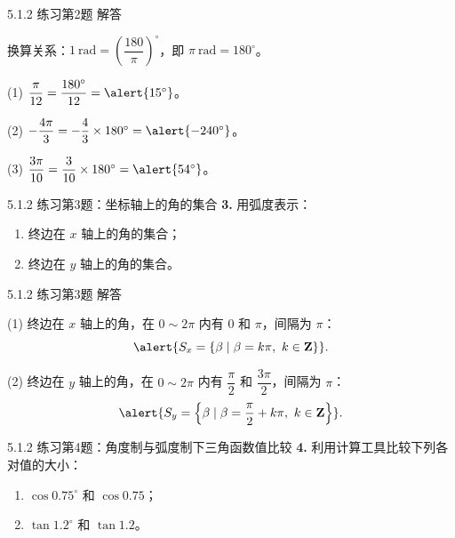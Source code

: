\documentclass[10pt,aspectratio=169,serif]{beamer}
\begin{document}
\begin{frame}[t]{5.1.2 练习第2题 解答}
\begin{tcolorbox}[colback=orange!10,colframe=orange,title=\textbf{解}]
换算关系：$1\ \text{rad} = \left(\dfrac{180}{\pi}\right)^\circ$，即 $\pi\ \text{rad}=180^\circ$。

\vspace{0.3em}
(1) $\dfrac{\pi}{12} = \dfrac{180^\circ}{12} = \alert{15^\circ}$。

(2) $-\dfrac{4\pi}{3} = -\dfrac{4}{3}\times 180^\circ = \alert{-240^\circ}$。

(3) $\dfrac{3\pi}{10} = \dfrac{3}{10}\times 180^\circ = \alert{54^\circ}$。
\end{tcolorbox}
\end{frame}

\begin{frame}[t]{5.1.2 练习第3题：坐标轴上的角的集合}
\textbf{3.} 用弧度表示：
\begin{enumerate}
  \item 终边在 $x$ 轴上的角的集合；
  \item 终边在 $y$ 轴上的角的集合。
\end{enumerate}
\end{frame}

\begin{frame}[t]{5.1.2 练习第3题 解答}
\begin{tcolorbox}[colback=orange!10,colframe=orange,title=\textbf{解}]
(1) 终边在 $x$ 轴上的角，在 $0\sim 2\pi$ 内有 $0$ 和 $\pi$，间隔为 $\pi$：
\[
\alert{S_x = \{\beta \mid \beta = k\pi,\ k\in\mathbf{Z}\}}.
\]

\vspace{0.5em}
(2) 终边在 $y$ 轴上的角，在 $0\sim 2\pi$ 内有 $\dfrac{\pi}{2}$ 和 $\dfrac{3\pi}{2}$，间隔为 $\pi$：
\[
\alert{S_y = \left\{\beta \mid \beta = \frac{\pi}{2} + k\pi,\ k\in\mathbf{Z}\right\}}.
\]
\end{tcolorbox}
\end{frame}

\begin{frame}[t]{5.1.2 练习第4题：角度制与弧度制下三角函数值比较}
\textbf{4.} 利用计算工具比较下列各对值的大小：
\begin{enumerate}
  \item $\cos 0.75^\circ$ 和 $\cos 0.75$；
  \item $\tan 1.2^\circ$ 和 $\tan 1.2$。
\end{enumerate}
\end{frame}
\end{document}
